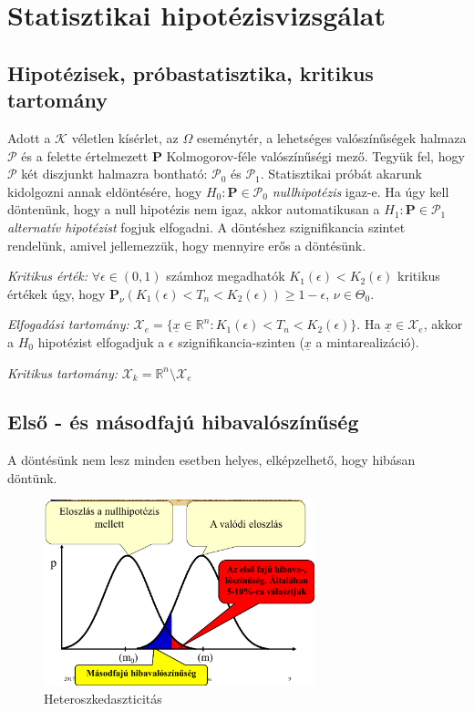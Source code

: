 \chapter{Statisztikai hipotézisvizsgálat}

\section{Hipotézisek, próbastatisztika, kritikus tartomány}

Adott a $\mathcal{K}$ véletlen kísérlet, az $\Omega$ eseménytér,  a lehetséges valószínűségek halmaza $\mathcal{P}$ és a felette értelmezett $\mathbf{P}$ Kolmogorov-féle valószínűségi mező. Tegyük fel, hogy $\mathcal{P}$ két diszjunkt halmazra bontható: $\mathcal{P}_0$ és $\mathcal{P}_1$. Statisztikai próbát akarunk kidolgozni annak eldöntésére, hogy $H_0:\mathbf{P}\in\mathcal{P}_0$ \emph{nullhipotézis} igaz-e. Ha úgy kell döntenünk, hogy a null hipotézis nem igaz, akkor automatikusan a $H_1:\mathbf{P}\in\mathcal{P}_1$ \emph{alternatív hipotézist} fogjuk elfogadni. A döntéshez szignifikancia szintet rendelünk, amivel jellemezzük, hogy mennyire erős a döntésünk.

\emph{Kritikus érték:} $\forall \epsilon \in (0,1)$ számhoz megadhatók $K_1(\epsilon) < K_2(\epsilon)$ kritikus értékek úgy, hogy $\mathbf{P}_\nu(K_1(\epsilon)< T_n < K_2(\epsilon)) \geq 1-\epsilon$, $\nu \in \Theta_0$.

\emph{Elfogadási tartomány:} $\mathcal{X}_e = \{\underline{x} \in \mathbb{R}^n : K_1(\epsilon)< T_n < K_2(\epsilon)\}$. Ha $\underline{x} \in \mathcal{X}_e$, akkor a $H_0$ hipotézist elfogadjuk a $\epsilon$ szignifikancia-szinten ($\underline{x}$ a mintarealizáció).

\emph{Kritikus tartomány:} $\mathcal{X}_k = \mathbb{R}^n \setminus \mathcal{X}_e$


\section{Első - és másodfajú hibavalószínűség}

A döntésünk nem lesz minden esetben helyes, elképzelhető, hogy hibásan döntünk.


\begin{figure}[h]
  \caption{Heteroszkedaszticitás}
  \centering
  \includegraphics[width=0.7\textwidth]{figures/hibafajtak.png}
\end{figure}


